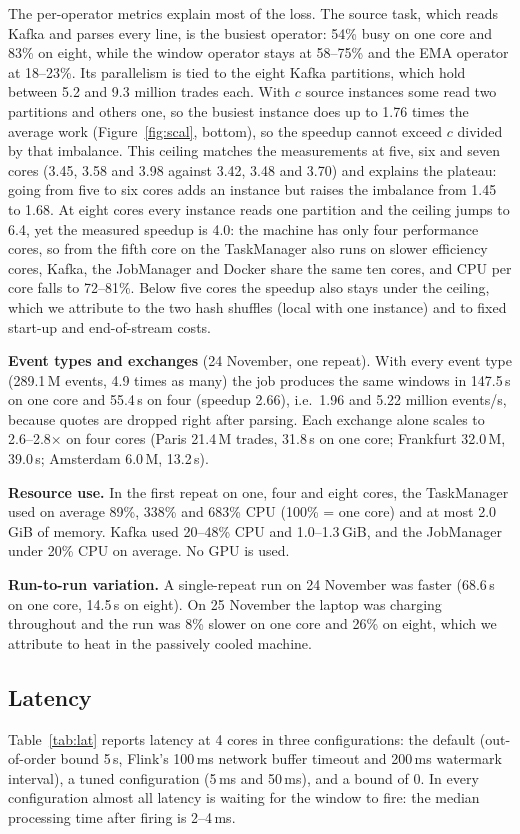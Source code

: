 \documentclass[sigconf]{acmart}
\begin{document}
The per-operator metrics explain most of the loss. The source task, which reads Kafka and parses every line, is the busiest operator: 54\% busy on one core and 83\% on eight, while the window operator stays at 58--75\% and the EMA operator at 18--23\%. Its parallelism is tied to the eight Kafka partitions, which hold between 5.2 and 9.3 million trades each. With $c$ source instances some read two partitions and others one, so the busiest instance does up to 1.76 times the average work (Figure~\ref{fig:scal}, bottom), so the speedup cannot exceed $c$ divided by that imbalance. This ceiling matches the measurements at five, six and seven cores (3.45, 3.58 and 3.98 against 3.42, 3.48 and 3.70) and explains the plateau: going from five to six cores adds an instance but raises the imbalance from 1.45 to 1.68. At eight cores every instance reads one partition and the ceiling jumps to 6.4, yet the measured speedup is 4.0: the machine has only four performance cores, so from the fifth core on the TaskManager also runs on slower efficiency cores, Kafka, the JobManager and Docker share the same ten cores, and CPU per core falls to 72--81\%. Below five cores the speedup also stays under the ceiling, which we attribute to the two hash shuffles (local with one instance) and to fixed start-up and end-of-stream costs.


\textbf{Event types and exchanges} (24 November, one repeat). With every event type (289.1\,M events, 4.9 times as many) the job produces the same windows in 147.5\,s on one core and 55.4\,s on four (speedup 2.66), i.e.\ 1.96 and 5.22 million events/s, because quotes are dropped right after parsing. Each exchange alone scales to 2.6--2.8$\times$ on four cores (Paris 21.4\,M trades, 31.8\,s on one core; Frankfurt 32.0\,M, 39.0\,s; Amsterdam 6.0\,M, 13.2\,s).

\textbf{Resource use.} %
In the first repeat on one, four and eight cores, the TaskManager used on average 89\%, 338\% and 683\% CPU (100\% = one core) and at most 2.0\,GiB of memory. Kafka used 20--48\% CPU and 1.0--1.3\,GiB, and the JobManager under 20\% CPU on average. No GPU is used.

\textbf{Run-to-run variation.} A single-repeat run on 24 November was faster (68.6\,s on one core, 14.5\,s on eight). On 25 November the laptop was charging throughout and the run was 8\% slower on one core and 26\% on eight, which we attribute to heat in the passively cooled machine.

\subsection{Latency}\label{sec:latency}
Table~\ref{tab:lat} reports latency at 4 cores in three configurations: the default (out-of-order bound 5\,s, Flink's 100\,ms network buffer timeout and 200\,ms watermark interval), a tuned configuration (5\,ms and 50\,ms), and a bound of 0. In every configuration almost all latency is waiting for the window to fire: the median processing time after firing is 2--4\,ms.
\end{document}

